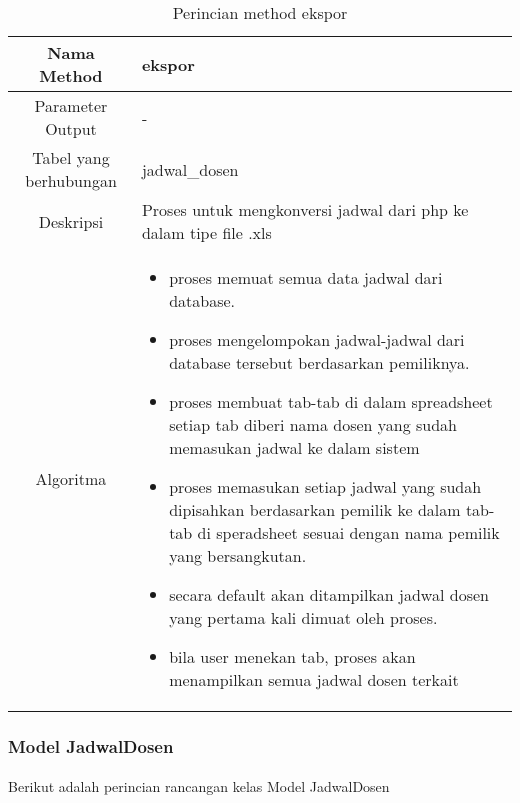 \begin{center}
\begin{table}[H]
\begin{tabular}{|c|p{11cm}|}
\hline
Nama Method 	& 	ekspor 	\\
\hline
Parameter Output & - \\
\hline
Tabel yang berhubungan & jadwal\_dosen \\
\hline
Deskripsi	& Proses untuk mengkonversi jadwal dari php ke dalam tipe file .xls \\
\hline
Algoritma	& \begin{itemize}
				\item proses memuat semua data jadwal dari database.
				\item proses mengelompokan jadwal-jadwal dari database tersebut berdasarkan pemiliknya.
				\item proses membuat tab-tab di dalam spreadsheet setiap tab diberi nama dosen yang sudah memasukan jadwal ke dalam sistem
				\item proses memasukan setiap jadwal yang sudah dipisahkan berdasarkan pemilik ke dalam tab-tab di speradsheet sesuai dengan nama pemilik yang bersangkutan.
				\item secara default akan ditampilkan jadwal dosen yang pertama kali dimuat oleh proses.
				\item bila user menekan tab, proses akan menampilkan semua jadwal dosen terkait
				\end{itemize} \\
\hline
\end{tabular}
\caption{Perincian method ekspor}
\end{table}
\end{center}


\subsubsection{Model JadwalDosen}
\paragraph{} Berikut adalah perincian rancangan kelas Model JadwalDosen

